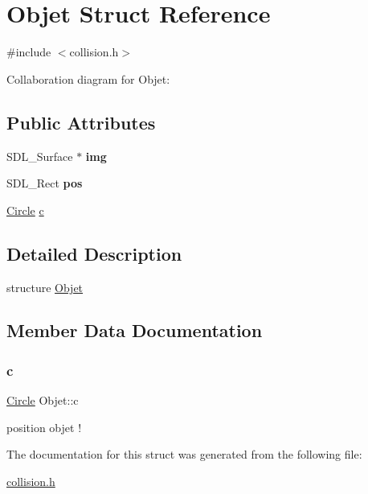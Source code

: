 \hypertarget{structObjet}{}\section{Objet Struct Reference}
\label{structObjet}


{\ttfamily \#include $<$collision.\+h$>$}



Collaboration diagram for Objet\+:
\subsection*{Public Attributes}
\begin{DoxyCompactItemize}
\item 
\mbox{\label{structObjet_a0dac95199f82a456854968bfe257a14e}} 
S\+D\+L\+\_\+\+Surface $\ast$ {\bfseries img}
\item 
\mbox{\label{structObjet_aa96c8e462a0637c98ab3c192e7f1806a}} 
S\+D\+L\+\_\+\+Rect {\bfseries pos}
\item 
\hyperlink{structCircle}{Circle} \hyperlink{structObjet_a5ca2a21e73d9832faccdffca0466574f}{c}
\end{DoxyCompactItemize}


\subsection{Detailed Description}
structure \hyperlink{structObjet}{Objet} 

\subsection{Member Data Documentation}
\mbox{\label{structObjet_a5ca2a21e73d9832faccdffca0466574f}} 
\subsubsection{\texorpdfstring{c}{c}}
{\footnotesize\ttfamily \hyperlink{structCircle}{Circle} Objet\+::c}

position objet ! 

The documentation for this struct was generated from the following file\+:\begin{DoxyCompactItemize}
\item 
\hyperlink{collision_8h}{collision.\+h}\end{DoxyCompactItemize}
